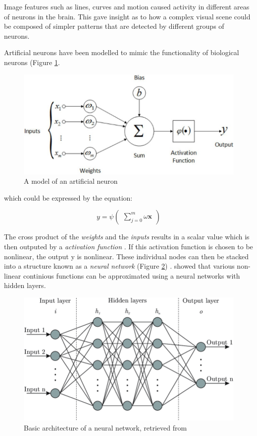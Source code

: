 \documentclass{UoNMCHA}
\numberwithin{equation}{section}
\begin{document}
Image features such as lines, curves and motion caused activity in different areas of neurons in the brain. This gave insight as to how a complex visual scene could be composed of simpler patterns that are detected by different groups of neurons.\
 

Artificial neurons have been modelled to mimic the functionality of biological neurons (Figure \ref{NEURONPERCEPTRON}.

\begin{figure}[H]
	\begin{center}
		\includegraphics[width=.7\linewidth]{Figures/Artificialneuron}
		\caption{A model of an artificial neuron}
		\label{NEURONPERCEPTRON}
	\end{center}
\end{figure}

which could be expressed by the equation:

\begin{equation}\label{eqn:Neuronequation} 
	y =  \psi 
	\begin{pmatrix} 
		\sum_{j=0}^{m} \omega\mathbf{x}
	\end{pmatrix}
\end{equation}

The cross product of the \textit{weights} and the \textit{inputs} results in a scalar value which is then outputed by a \textit{activation function }. If this activation function is chosen to be nonlinear, the output y is nonlinear. These individual nodes can then be stacked into a structure known as a \textit{neural network} (Figure \ref{fig:nnarch}) . \cite{252103} showed that various non-linear continious functions can be approximated using a neural networks with hidden layers. \

\begin{figure}[H]
	\begin{center}
		\includegraphics[width=.8\linewidth]{Figures/nnarchitecture}
		\caption{Basic architecture of a neural network, retrieved from \citep{neuralnetworkarch}  }
		\label{fig:nnarch}
	\end{center}
\end{figure}
\end{document}
